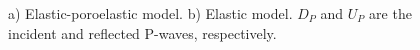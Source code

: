 \documentclass[draft]{agujournal2019}
\begin{document}
 \begin{figure}[!ht]
\centering
{}
        
\caption{ a) Elastic-poroelastic model. b) Elastic model. $D_P$ and $U_P$ are the incident and reflected P-waves, respectively. }
\label{fig:1}
\end{figure}
\end{document}
